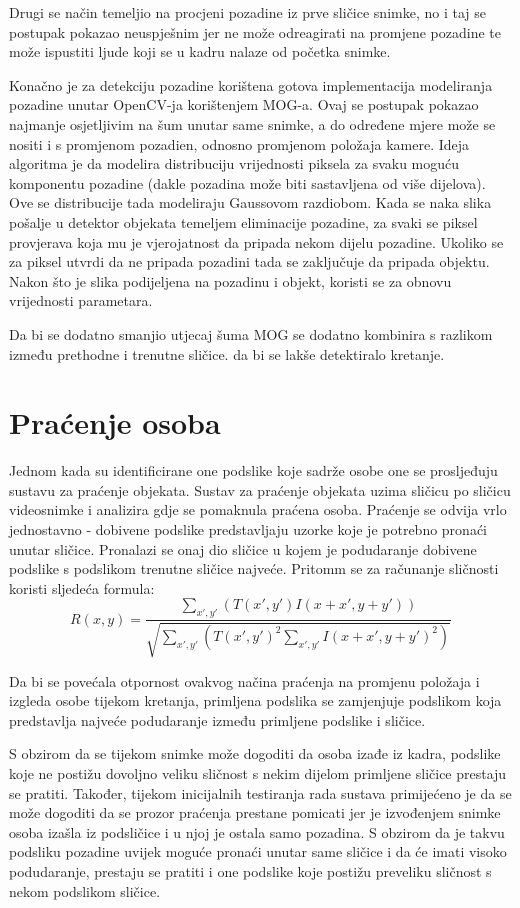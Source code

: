 \documentclass[times, utf8, seminar, numeric]{fer}
\begin{document}
Drugi se način temeljio na procjeni pozadine iz prve sličice snimke, no i taj se postupak pokazao neuspješnim jer ne može odreagirati na promjene pozadine te može ispustiti ljude koji se u kadru nalaze od početka snimke. 

Konačno je za detekciju pozadine korištena gotova implementacija modeliranja pozadine unutar OpenCV-ja korištenjem MOG-a. Ovaj se postupak pokazao najmanje osjetljivim na šum unutar same snimke, a do određene mjere može se nositi i s promjenom pozadien, odnosno promjenom položaja kamere. Ideja algoritma je da modelira distribuciju vrijednosti piksela za svaku moguću komponentu pozadine (dakle pozadina može biti sastavljena od više dijelova). Ove se distribucije tada modeliraju Gaussovom razdiobom. Kada se naka slika pošalje u detektor objekata temeljem eliminacije pozadine, za svaki se piksel provjerava koja mu je vjerojatnost da pripada nekom dijelu pozadine. Ukoliko se za piksel utvrdi da ne pripada pozadini tada se zaključuje da pripada objektu. Nakon što je slika podijeljena na pozadinu i objekt, koristi se za obnovu vrijednosti parametara.

Da bi se dodatno smanjio utjecaj šuma MOG se dodatno kombinira s razlikom između prethodne i trenutne sličice. da bi se lakše detektiralo kretanje.

\section{Praćenje osoba}
Jednom kada su identificirane one podslike koje sadrže osobe one se prosljeđuju sustavu za praćenje objekata. Sustav za praćenje objekata uzima sličicu po sličicu videosnimke i analizira gdje se pomaknula praćena osoba. Praćenje se odvija vrlo jednostavno - dobivene podslike predstavljaju uzorke koje je potrebno pronaći unutar sličice. Pronalazi se onaj dio sličice u kojem je podudaranje dobivene podslike s podslikom trenutne sličice najveće. Pritomm se za računanje sličnosti koristi sljedeća formula:
\begin{equation}
R(x,y)=\frac{ \sum_{x',y'}(T(x',y')I(x + x', y+y'))}{\sqrt{\sum_{x',y'}(T(x',y')^2\sum_{x',y'}I(x + x', y+y')^2)}}
\end{equation}

Da bi se povećala otpornost ovakvog načina praćenja na promjenu položaja i izgleda osobe tijekom kretanja, primljena podslika se zamjenjuje podslikom koja predstavlja najveće podudaranje između primljene podslike i sličice.

S obzirom da se tijekom snimke može dogoditi da osoba izađe iz kadra, podslike koje ne postižu dovoljno veliku sličnost s nekim dijelom primljene sličice prestaju se pratiti. Također, tijekom inicijalnih testiranja rada sustava primijećeno je da se može dogoditi da se prozor praćenja prestane pomicati jer je izvođenjem snimke osoba izašla iz podsličice i u njoj je ostala samo pozadina. S obzirom da je takvu podsliku pozadine uvijek moguće pronaći unutar same sličice i da će imati visoko podudaranje, prestaju se pratiti i one podslike koje postižu preveliku sličnost s nekom podslikom sličice.
\end{document}
